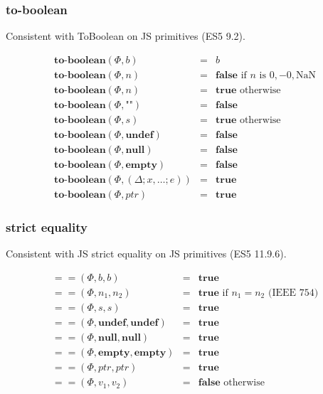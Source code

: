 \documentclass[draft, 10pt]{article}
\newcommand{\expr}[0]{e}
\newcommand{\var}[0]{x}
\newcommand{\bool}[0]{b}
\newcommand{\num}[0]{n}
\newcommand{\str}[0]{s}
\newcommand{\nan}[0]{\textrm{NaN}}
\newcommand{\undef}[0]{\textbf{undef}}
\newcommand{\nul}[0]{\textbf{null}}
\newcommand{\empt}[0]{\textbf{empty}}
\newcommand{\true}[0]{\textbf{true}}
\newcommand{\false}[0]{\textbf{false}}
\newcommand{\optobool}[0]{\textbf{to-boolean}}
\newcommand{\opstxeq}[0]{==}
\newcommand{\varenv}[0]{\Delta}
\newcommand{\heap}[0]{\Phi}
\newcommand{\closure}[3]{(#1; #2; #3)}
\newcommand{\bigval}[0]{v}
\newcommand{\heapptr}{ptr}
\newcommand{\rununop}[3]{#1(#2,#3)}
\newcommand{\runbinop}[4]{#1(#2,#3,#4)}
\begin{document}
\subsubsection{to-boolean}

Consistent with ToBoolean on JS primitives (ES5 9.2).

\[
\begin{array}{rcl}
\rununop{\optobool}{\heap}{\bool} &=& \bool \\
\rununop{\optobool}{\heap}{\num} &=& \false \textrm{ if $\num$ is $0, -0, \nan$} \\
\rununop{\optobool}{\heap}{\num} &=& \true \textrm{ otherwise} \\
\rununop{\optobool}{\heap}{\texttt{""}} &=& \false \\
\rununop{\optobool}{\heap}{\str} &=& \true \textrm{ otherwise} \\
\rununop{\optobool}{\heap}{\undef} &=& \false \\
\rununop{\optobool}{\heap}{\nul} &=& \false \\
\rununop{\optobool}{\heap}{\empt} &=& \false \\
\rununop{\optobool}{\heap}{\closure{\varenv}{\var, \dots}{\expr}} &=& \true \\
\rununop{\optobool}{\heap}{\heapptr} &=& \true
\end{array}
\]

\subsubsection{strict equality}

Consistent with JS strict equality on JS primitives (ES5 11.9.6).

\[
\begin{array}{rcl}
\runbinop{\opstxeq}{\heap}{\bool}{\bool} &=& \true \\
\runbinop{\opstxeq}{\heap}{\num_1}{\num_2} &=& \true \textrm{ if $\num_1 = \num_2$ (IEEE 754)} \\
\runbinop{\opstxeq}{\heap}{\str}{\str} &=& \true \\
\runbinop{\opstxeq}{\heap}{\undef}{\undef} &=& \true \\
\runbinop{\opstxeq}{\heap}{\nul}{\nul} &=& \true \\
\runbinop{\opstxeq}{\heap}{\empt}{\empt} &=& \true \\
\runbinop{\opstxeq}{\heap}{\heapptr}{\heapptr} &=& \true \\
\runbinop{\opstxeq}{\heap}{\bigval_1}{\bigval_2} &=& \false \textrm{ otherwise} 
\end{array}
\]
\end{document}
